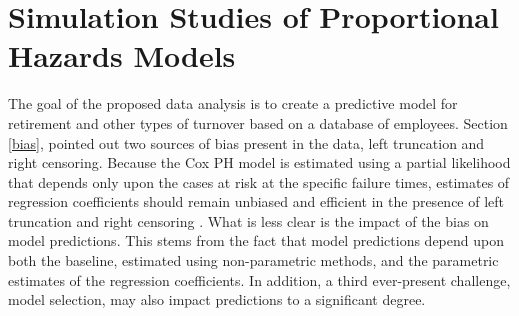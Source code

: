 \documentclass[12pt,letterpaper]{article}
\begin{document}
%
 \section{Simulation Studies of Proportional Hazards Models}

The goal of the proposed data analysis is to create a predictive model for retirement and other types of turnover based on a database of employees.  Section \ref{bias}, pointed out two sources of bias present in the data, left truncation and right censoring.  Because the Cox PH model is estimated using a partial likelihood that depends only upon the cases at risk at the specific failure times, estimates of regression coefficients should remain unbiased and efficient in the presence of left truncation and right censoring \citep{Harrell2002}.  What is less clear is the impact of the bias on model predictions. This stems from the fact that model predictions depend upon both the baseline, estimated using non-parametric methods, and the parametric estimates of the regression coefficients.  In addition, a third ever-present challenge, model selection, may also impact predictions to a significant degree.
\end{document}
